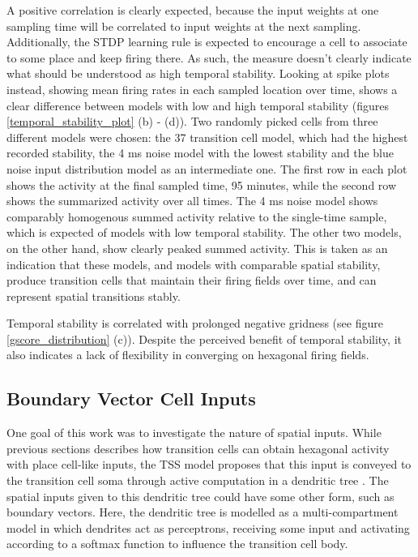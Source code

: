 \documentclass{article}
\begin{document}
    A positive correlation is clearly expected, because the input weights at one sampling time will be correlated to input weights at the next sampling. Additionally, the STDP learning rule is expected to encourage a cell to associate to some place and keep firing there. As such, the measure doesn't clearly indicate what should be understood as high temporal stability. Looking at spike plots instead, showing mean firing rates in each sampled location over time, shows a clear difference between models with low and high temporal stability (figures \ref{temporal_stability_plot} (b) - (d)). Two randomly picked cells from three different models were chosen: the 37 transition cell model, which had the highest recorded stability, the 4 ms noise model with the lowest stability and the blue noise input distribution model as an intermediate one. The first row in each plot shows the activity at the final sampled time, 95 minutes, while the second row shows the summarized activity over all times. The 4 ms noise model shows comparably homogenous summed activity relative to the single-time sample, which is expected of models with low temporal stability. The other two models, on the other hand, show clearly peaked summed activity. This is taken as an indication that these models, and models with comparable spatial stability, produce transition cells that maintain their firing fields over time, and can represent spatial transitions stably.

    Temporal stability is correlated with prolonged negative gridness (see figure \ref{gscore_distribution} (c)). Despite the perceived benefit of temporal stability, it also indicates a lack of flexibility in converging on hexagonal firing fields.

    \subsection{Boundary Vector Cell Inputs} \label{MCModResult}
    One goal of this work was to investigate the nature of spatial inputs. While previous sections describes how transition cells can obtain hexagonal activity with place cell-like inputs, the TSS model proposes that this input is conveyed to the transition cell soma through active computation in a dendritic tree \parencite{Waniek2020}. The spatial inputs given to this dendritic tree could have some other form, such as boundary vectors. Here, the dendritic tree is modelled as a multi-compartment model in which dendrites act as perceptrons, receiving some input and activating according to a softmax function to influence the transition cell body.
\end{document}
